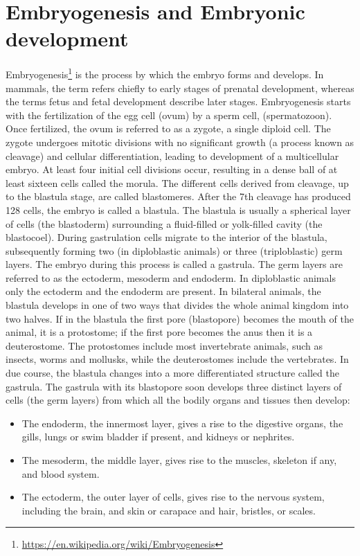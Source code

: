 \documentclass[]{book}
\providecommand{\tightlist}{%
  \setlength{\itemsep}{0pt}\setlength{\parskip}{0pt}}
\let\rmarkdownfootnote\footnote%
\def\footnote{\protect\rmarkdownfootnote}
\renewcommand{\href}[2]{#2\footnote{\url{#1}}}
\begin{document}
\hypertarget{embryogenesis-and-embryonic-development}{%
\section{Embryogenesis and Embryonic development}\label{embryogenesis-and-embryonic-development}}

\href{https://en.wikipedia.org/wiki/Embryogenesis}{Embryogenesis} is the process by which the embryo forms and develops. In mammals, the term refers chiefly to early stages of prenatal development, whereas the terms fetus and fetal development describe later stages. Embryogenesis starts with the fertilization of the egg cell (ovum) by a sperm cell, (spermatozoon). Once fertilized, the ovum is referred to as a zygote, a single diploid cell. The zygote undergoes mitotic divisions with no significant growth (a process known as cleavage) and cellular differentiation, leading to development of a multicellular embryo. At least four initial cell divisions occur, resulting in a dense ball of at least sixteen cells called the morula. The different cells derived from cleavage, up to the blastula stage, are called blastomeres. After the 7th cleavage has produced 128 cells, the embryo is called a blastula. The blastula is usually a spherical layer of cells (the blastoderm) surrounding a fluid-filled or yolk-filled cavity (the blastocoel). During gastrulation cells migrate to the interior of the blastula, subsequently forming two (in diploblastic animals) or three (triploblastic) germ layers. The embryo during this process is called a gastrula. The germ layers are referred to as the ectoderm, mesoderm and endoderm. In diploblastic animals only the ectoderm and the endoderm are present.
In bilateral animals, the blastula develops in one of two ways that divides the whole animal kingdom into two halves. If in the blastula the first pore (blastopore) becomes the mouth of the animal, it is a protostome; if the first pore becomes the anus then it is a deuterostome. The protostomes include most invertebrate animals, such as insects, worms and mollusks, while the deuterostomes include the vertebrates. In due course, the blastula changes into a more differentiated structure called the gastrula.
The gastrula with its blastopore soon develops three distinct layers of cells (the germ layers) from which all the bodily organs and tissues then develop:

\begin{itemize}
\tightlist
\item
  The endoderm, the innermost layer, gives a rise to the digestive organs, the gills, lungs or swim bladder if present, and kidneys or nephrites.
\item
  The mesoderm, the middle layer, gives rise to the muscles, skeleton if any, and blood system.
\item
  The ectoderm, the outer layer of cells, gives rise to the nervous system, including the brain, and skin or carapace and hair, bristles, or scales.
\end{itemize}
\end{document}
